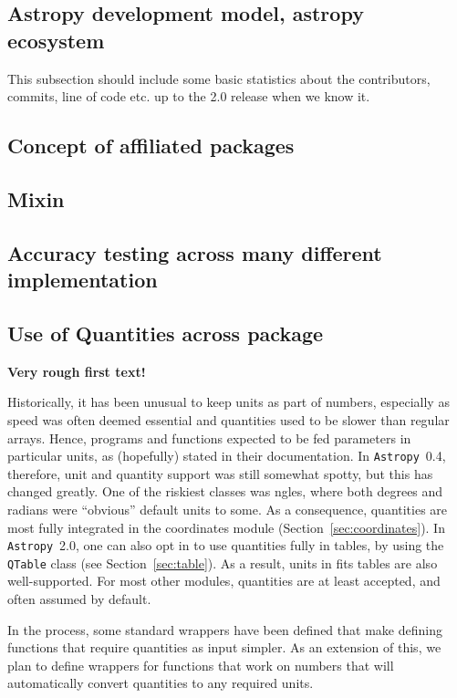\documentclass[modern]{aastex61}
\newcommand{\package}[1]{\texttt{#1}}
\newcommand{\astropypkg}{\package{Astropy}}
\newcommand{\sectionname}{Section}
\begin{document}
\subsection{Astropy development model, astropy ecosystem}
This subsection should include some basic statistics about the contributors, commits, line of code etc. up to the 2.0 release when we know it.

\subsection{Concept of affiliated packages}

\subsection{Mixin}

\subsection{Accuracy testing across many different implementation}

\subsection{Use of Quantities across package}

{\bf Very rough first text!}

Historically, it has been unusual to keep units as part of numbers, especially as speed was often deemed essential and quantities used to be slower than regular arrays. Hence, programs and functions expected to be fed parameters in particular units, as (hopefully) stated in their documentation.  In \astropypkg\ 0.4, therefore, unit and quantity support was still somewhat spotty, but this has changed greatly.  One of the riskiest classes was ngles, where both degrees and radians were ``obvious'' default units to some. As a consequence, quantities are most fully integrated in the coordinates module (\sectionname~\ref{sec:coordinates}). In \astropypkg\ 2.0, one can also opt in to use quantities fully in tables, by using the {\tt QTable} class (see \sectionname~\ref{sec:table}). As a result, units in fits tables are also well-supported. For most other modules, quantities are at least accepted, and often assumed by default.

In the process, some standard wrappers have been defined that make defining functions that require quantities as input simpler. As an extension of this, we plan to define wrappers for functions that work on numbers that will automatically convert quantities to any required units.
\end{document}
